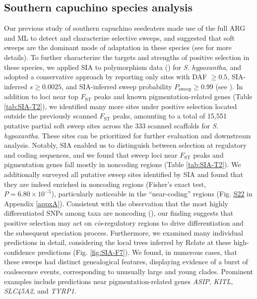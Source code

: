 \subsection{Southern capuchino species analysis}
Our previous study of southern capuchino seedeaters made use of the full \ac{ARG} and \ac{ML} to detect and characterize selective sweeps, and suggested that soft sweeps are the dominant mode of adaptation in these species (see  for more details). To further characterize the targets and strengths of positive selection in these species, we applied \ac{SIA} to polymorphism data (\cite{turbek_rapid_2021}) for \textit{S. hypoxantha}, and adopted a conservative approach by reporting only sites with \ac{DAF} $\geq 0.5$, \ac{SIA}-inferred $s \geq 0.0025$, and \ac{SIA}-inferred sweep probability $P_{\mathrm{sweep}} \geq 0.99$ (see ). In addition to loci near top $F_{\mathrm{ST}}$ peaks and known pigmentation-related genes (Table \ref{tab:SIA-T2}), we identified many more sites under positive selection located outside the previously scanned $F_{\mathrm{ST}}$ peaks, amounting to a total of 15,551 putative partial soft sweep sites across the 333 scanned scaffolds for \textit{S. hypoxantha}. These sites can be prioritized for further evaluation and downstream analysis. Notably, \ac{SIA} enabled us to distinguish between selection at regulatory and coding sequences, and we found that sweep loci near $F_{\mathrm{ST}}$ peaks and pigmentation genes fall mostly in noncoding regions (Table \ref{tab:SIA-T2}). We additionally surveyed all putative sweep sites identified by \ac{SIA} and found that they are indeed enriched in noncoding regions (Fisher’s exact test, $P = 6.80 \times 10^{-5}$), particularly noticeable in the “near-coding” regions (Fig. \href{https://academic.oup.com/mbe/article/39/1/msab332/6433161?login=true#supplementary-data}{S22} in Appendix \ref{appxA}). Consistent with the observation that the most highly differentiated \acsp{SNP} among taxa are noncoding (\cite{campagna_repeated_2017,turbek_rapid_2021}), our finding suggests that positive selection may act on \textit{cis}-regulatory regions to drive differentiation and the subsequent speciation process. Furthermore, we examined many individual predictions in detail, considering the local trees inferred by Relate at these high-confidence predictions (Fig. \ref{fig:SIA-F7}). We found, in numerous cases, that these sweeps had distinct genealogical features, displaying evidence of a burst of coalescence events, corresponding to unusually large and young clades. Prominent examples include predictions near pigmentation-related genes \textit{ASIP}, \textit{KITL}, \textit{SLC45A2}, and \textit{TYRP1}.

